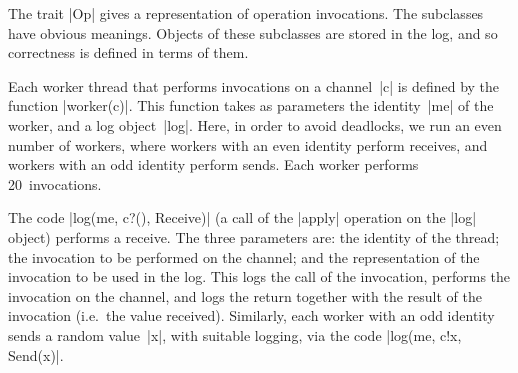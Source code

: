 








The trait |Op| gives a representation of operation invocations.  The
subclasses have obvious meanings.  Objects of these subclasses are stored in
the log, and so correctness is defined in terms of them.

Each worker thread that performs invocations on a channel~|c| is defined by
the function |worker(c)|.  This function takes as parameters the identity~|me|
of the worker, and a log object~|log|.  Here, in order to avoid deadlocks, we
run an even number of workers, where workers with an even identity perform
receives, and workers with an odd identity perform sends.  Each worker
performs 20~invocations.  

The code |log(me, c?(), Receive)| (a call of the |apply| operation on the
|log| object) performs a receive.  The three parameters are: the identity of
the thread; the invocation to be performed on the channel; and the
representation of the invocation to be used in the log.  This logs the call of
the invocation, performs the invocation on the channel, and logs the return
together with the result of the invocation (i.e.~the value received).
Similarly, each worker with an odd identity sends a random value~|x|, with
suitable logging, via the code |log(me, c!x, Send(x)|.

